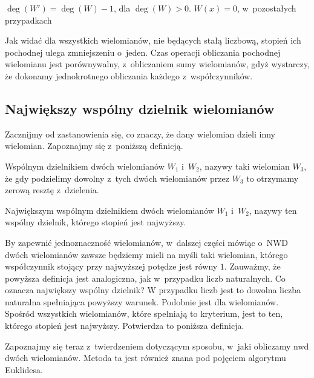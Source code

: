 \begin{theorem}
	$ $\\
	$\deg(W') = \deg(W) - 1$, dla $\deg(W) > 0$. $W(x) = 0$, w~pozostałych przypadkach
\end{theorem}

Jak widać dla wszystkich wielomianów, nie będących stałą liczbową, stopień ich pochodnej ulega zmniejszeniu o~jeden. Czas operacji obliczania pochodnej wielomianu jest porównywalny, z~obliczaniem sumy wielomianów, gdyż wystarczy, że dokonamy jednokrotnego obliczania każdego z~współczynników.

\subsection{Największy wspólny dzielnik wielomianów}

Zacznijmy od zastanowienia się, co znaczy, że dany wielomian dzieli inny wielomian. Zapoznajmy się z~poniższą definicją.

\begin{definition}
	$ $\\
	Wspólnym dzielnikiem dwóch wielomianów $W_1$ i~$W_2$, nazywy taki wielomian $W_3$, że gdy podzielimy dowolny z~tych dwóch wielomianów przez $W_3$ to otrzymamy zerową resztę z~dzielenia.
\end{definition}

\begin{definition}
	$ $\\
	Największym wspólnym dzielnikiem dwóch wielomianów $W_1$ i~$W_2$, nazywy ten wspólny dzielnik, którego stopień jest najwyższy.
\end{definition}

By zapewnić jednoznaczność wielomianów, w~dalszej części mówiąc o~NWD dwóch wielomianów zawsze będziemy mieli na myśli taki wielomian, którego współczynnik stojący przy najwyższej potędze jest równy $1$. Zauważmy, że powyższa definicja jest analogiczna, jak w~przypadku liczb naturalnych.
Co oznacza największy wspólny dzielnik? W przypadku liczb jest to dowolna liczba naturalna spełniająca powyższy warunek. Podobnie jest dla wielomianów. Spośród wszystkich wielomianów, które spełniają to kryterium, jest to ten, którego stopień jest najwyższy. Potwierdza to poniższa definicja.

Zapoznajmy się teraz z~twierdzeniem dotyczącym sposobu, w~jaki obliczamy nwd dwóch wielomianów. Metoda ta jest również znana pod pojęciem algorytmu Euklidesa.

